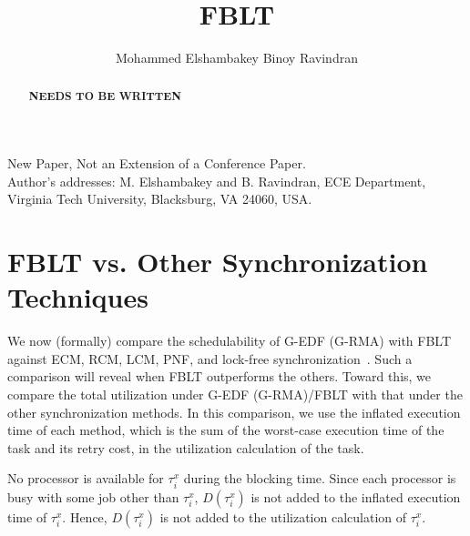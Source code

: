 \documentclass[prodmode,acmtecs]{acmsmall}
\begin{document}

\title{FBLT}
\author{Mohammed Elshambakey
Binoy Ravindran
}

\begin{abstract}
\bf{NEEDS TO BE WRITTEN}
\end{abstract}





\begin{bottomstuff}
New Paper, Not an Extension of a Conference Paper.\\
Author's addresses: M. Elshambakey {and} B. Ravindran, ECE Department,
Virginia Tech University, Blacksburg, VA 24060, USA.
\end{bottomstuff}

\maketitle



\section{FBLT vs. Other Synchronization Techniques}\label{schedulabiltiy comparison}

We now (formally) compare the schedulability of G-EDF (G-RMA) with FBLT against ECM, RCM, LCM, PNF, and lock-free synchronization~\cite{stmconcurrencycontrol:emsoft11,lcmdac2012,key-5,shambake_phd_proposal}. 
Such a comparison will reveal when FBLT outperforms the others. Toward this, we compare the total utilization under G-EDF (G-RMA)/FBLT with that under the other synchronization methods. In this comparison, we use the inflated execution time of each method, 
which is the sum of the worst-case execution time of the task and its retry cost, in the utilization calculation of the task.

No processor is available for $\tau_i^x$ during the blocking time. 
Since each processor is busy with some job other than $\tau_i^x$, $D(\tau_i^x)$ is not added to the inflated execution time of $\tau_i^x$. Hence, $D(\tau_i^x)$ is not added to the utilization calculation of $\tau_i^x$.
\end{document}
